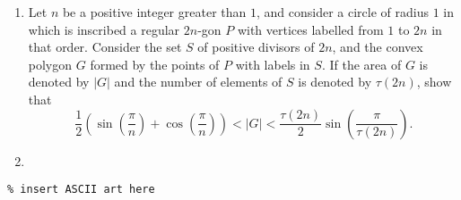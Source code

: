\documentclass{article}
\begin{document}
\begin{enumerate}[1.]
\vfill

\item %
\newcommand{\parens}[1]{\left(#1\right)}
Let $n$ be a positive integer greater than $1$, and consider a circle of radius $1$ in which is inscribed a regular $2n$-gon $P$ with vertices labelled from $1$ to $2n$ in that order.
Consider the set $S$ of positive divisors of $2n$, and the convex polygon $G$ formed by the points of $P$ with labels in $S$.
If the area of $G$ is denoted by $|G|$ and the number of elements of $S$ is denoted by $\tau(2n)$, show that
\[ \frac{1}{2} \parens{\sin\parens{\frac{\pi}{n}} +\cos\parens{\frac{\pi}{n}}} < |G| < \frac{\tau(2n)}{2} \sin\parens{\frac{\pi}{\tau(2n)}}. \]


\vfill

\item %


\end{enumerate}


\vfill
\vfill

\begin{center}
\begin{BVerbatim}
\end{BVerbatim}
\end{center}
\end{document}
